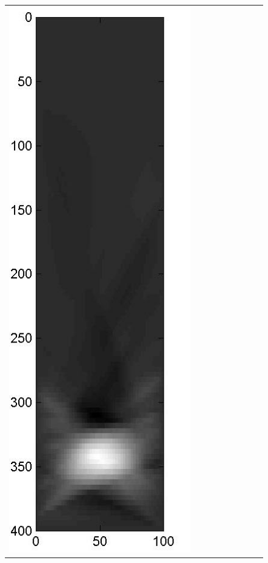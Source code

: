 \documentclass[11pt]{article}
\begin{document}
\begin{figure}[!h]
\begin{center}
\begin{tabular}{|c|c|c|c|c|c|c|c|c|}
			\includegraphics[width=.9\iwidth]{figures/newFigs/noisy/resultsExp-8-mk}
			&

\end{tabular}
\end{center}
\end{figure}
\end{document}
